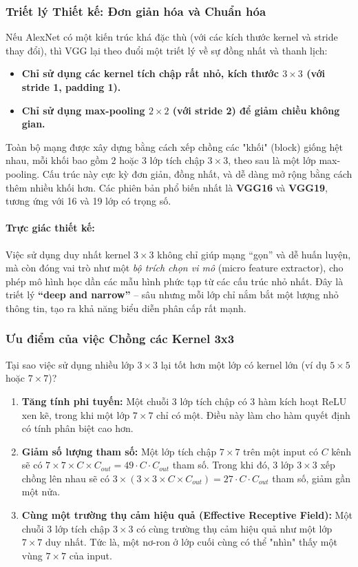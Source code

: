 \subsubsection{Triết lý Thiết kế: Đơn giản hóa và Chuẩn hóa}
\label{subsubsec:vgg_philosophy}
Nếu AlexNet có một kiến trúc khá đặc thù (với các kích thước kernel và stride thay đổi), thì VGG lại theo đuổi một triết lý về sự đồng nhất và thanh lịch:
\begin{itemize}
	\item \textbf{Chỉ sử dụng các kernel tích chập rất nhỏ, kích thước $3 \times 3$ (với stride 1, padding 1).}
	\item \textbf{Chỉ sử dụng max-pooling $2 \times 2$ (với stride 2) để giảm chiều không gian.}
\end{itemize}
Toàn bộ mạng được xây dựng bằng cách xếp chồng các "khối" (block) giống hệt nhau, mỗi khối bao gồm 2 hoặc 3 lớp tích chập $3 \times 3$, theo sau là một lớp max-pooling. Cấu trúc này cực kỳ đơn giản, đồng nhất, và dễ dàng mở rộng bằng cách thêm nhiều khối hơn. Các phiên bản phổ biến nhất là \textbf{VGG16} và \textbf{VGG19}, tương ứng với 16 và 19 lớp có trọng số.

\paragraph{Trực giác thiết kế:} 
Việc sử dụng duy nhất kernel $3 \times 3$ không chỉ giúp mạng “gọn” và dễ huấn luyện, 
mà còn đóng vai trò như một \textit{bộ trích chọn vi mô} (micro feature extractor), 
cho phép mô hình học dần các mẫu hình phức tạp từ các cấu trúc nhỏ nhất. 
Đây là triết lý \textbf{“deep and narrow”} – sâu nhưng mỗi lớp chỉ nắm bắt một lượng nhỏ thông tin, 
tạo ra khả năng biểu diễn phân cấp rất mạnh.

\subsubsection{Ưu điểm của việc Chồng các Kernel 3x3}
\label{subsubsec:vgg_3x3_kernels}
Tại sao việc sử dụng nhiều lớp $3 \times 3$ lại tốt hơn một lớp có kernel lớn (ví dụ $5 \times 5$ hoặc $7 \times 7$)?
\begin{enumerate}
	\item \textbf{Tăng tính phi tuyến:} Một chuỗi 3 lớp tích chập có 3 hàm kích hoạt ReLU xen kẽ, trong khi một lớp $7 \times 7$ chỉ có một. Điều này làm cho hàm quyết định có tính phân biệt cao hơn.
	\item \textbf{Giảm số lượng tham số:} Một lớp tích chập $7 \times 7$ trên một input có $C$ kênh sẽ có $7 \times 7 \times C \times C_{out} = 49 \cdot C \cdot C_{out}$ tham số. Trong khi đó, 3 lớp $3 \times 3$ xếp chồng lên nhau sẽ có $3 \times (3 \times 3 \times C \times C_{out}) = 27 \cdot C \cdot C_{out}$ tham số, giảm gần một nửa.
	\item \textbf{Cùng một trường thụ cảm hiệu quả (Effective Receptive Field):} Một chuỗi 3 lớp tích chập $3 \times 3$ có cùng trường thụ cảm hiệu quả như một lớp $7 \times 7$ duy nhất. Tức là, một nơ-ron ở lớp cuối cùng có thể "nhìn" thấy một vùng $7 \times 7$ của input.
\end{enumerate}

